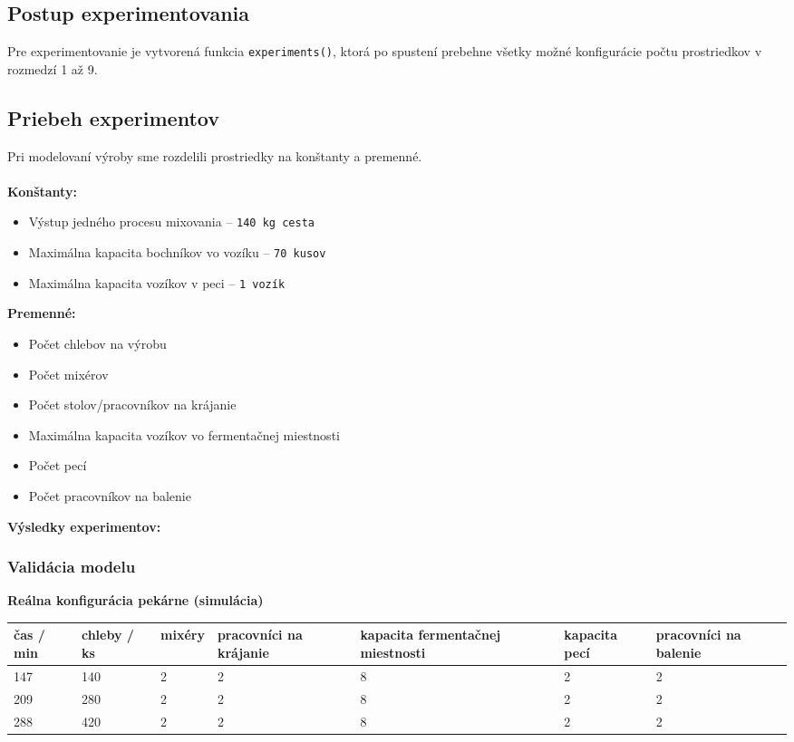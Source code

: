 \documentclass[a4paper, 10pt]{article}
\begin{document}
    \subsection{Postup experimentovania}
    Pre experimentovanie je vytvorená funkcia \texttt{experiments()}, ktorá po spustení prebehne všetky možné
    konfigurácie počtu prostriedkov v rozmedzí 1 až 9.

    \subsection{Priebeh experimentov}
    Pri modelovaní výroby sme rozdelili prostriedky na konštanty a premenné.\\ \\
    \textbf{Konštanty:}
    \begin{itemize}
        \item Výstup jedného procesu mixovania -- \texttt{140 kg cesta}
        \item Maximálna kapacita bochníkov vo vozíku -- \texttt{70 kusov}
        \item Maximálna kapacita vozíkov v peci -- \texttt{1 vozík}
    \end{itemize}
    \textbf{Premenné:}
    \begin{itemize}
        \item Počet chlebov na výrobu
        \item Počet mixérov
        \item Počet stolov/pracovníkov na krájanie
        \item Maximálna kapacita vozíkov vo fermentačnej miestnosti
        \item Počet pecí
        \item Počet pracovníkov na balenie
    \end{itemize}
    \textbf{Výsledky experimentov:}\\

    \subsubsection{Validácia modelu}
    \textbf{Reálna konfigurácia pekárne (simulácia)}
    \begin{center}
        \begin{tabular}{ |p{2cm}|p{2cm}|p{2cm}|p{2cm}|p{2cm}|p{2cm}|p{2cm}| }
            \hline
            čas / min & chleby / ks & mixéry & pracovníci na krájanie & kapacita fermentačnej miestnosti & kapacita pecí & pracovníci na balenie \\
            \hline\hline
            147       & 140         & 2      & 2                      & 8                                & 2             & 2                     \\ \hline
            209       & 280         & 2      & 2                      & 8                                & 2             & 2                     \\ \hline
            288       & 420         & 2      & 2                      & 8                                & 2             & 2                     \\ \hline
        \end{tabular}
    \end{center}
\end{document}
